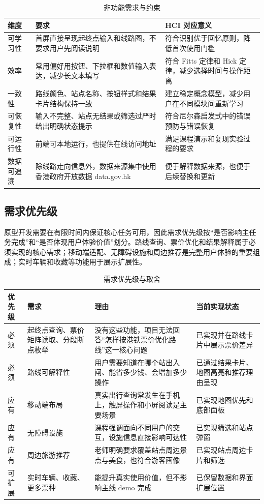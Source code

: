 \documentclass[UTF8,a4paper,11pt]{ctexart}
\begin{document}
\begin{table}[H]
  \centering
  \caption{非功能需求与约束}
  \begin{tabularx}{\textwidth}{p{}YY}
    \toprule
    维度 & 要求 & HCI 对应意义 \\
    \midrule
    可学习性 & 首屏直接呈现起终点输入和线路图，不要求用户先阅读说明 & 符合识别优于回忆原则，降低首次使用门槛 \\
    效率 & 常用偏好用按钮、下拉框和数值输入表达，减少长文本填写 & 符合 Fitts 定律和 Hick 定律，减少选择时间与操作距离 \\
    一致性 & 路线颜色、站点名称、按钮样式和结果卡片结构保持一致 & 建立稳定概念模型，减少用户在不同模块间重新学习 \\
    可恢复性 & 输入不完整、站点无结果或筛选过严时给出明确状态提示 & 符合尼尔森启发式中的错误预防与错误恢复 \\
    可运行性 & 前端可本地运行，也提供在线访问地址 & 满足课程演示和复现实验过程的要求 \\
    数据可追溯 & 除线路走向信息外，数据来源集中使用香港政府开放数据 data.gov.hk & 便于解释数据来源，也便于后续替换和更新 \\
    \bottomrule
  \end{tabularx}
\end{table}

\subsection{需求优先级}

原型开发需要在有限时间内保证核心任务可用，因此需求优先级按“是否影响主任务完成”和“是否体现用户体验价值”划分。路线查询、票价优化和结果解释属于必须实现的核心需求；移动端适配、无障碍设施和周边推荐是完整用户体验的重要组成；实时车辆和收藏等功能用于展示扩展性。

\begin{table}[H]
  \centering
  \caption{需求优先级与取舍}
  \begin{tabularx}{\textwidth}{p{}p{}YY}
    \toprule
    优先级 & 需求 & 理由 & 当前实现状态 \\
    \midrule
    必须 & 起终点查询、票价矩阵读取、分段断点枚举 & 没有这些功能，项目无法回答“怎样按港铁票价优化路线”这一核心问题 & 已实现并在路线卡片中展示票价差异 \\
    必须 & 路线可解释性 & 用户需要知道在哪个站出入闸、能省多少钱、会增加多少操作 & 已通过结果卡片、地图高亮和推荐理由呈现 \\
    应有 & 移动端布局 & 真实出行查询常发生在手机上，触屏操作和小屏阅读是主要场景 & 已实现地图优先和底部面板 \\
    应有 & 无障碍设施 & 课程强调面向不同用户的交互，设施信息直接影响可达性 & 已实现筛选和站点弹窗 \\
    应有 & 周边旅游推荐 & 老师明确要求覆盖站点周边景点与美食，也符合游客画像 & 已实现站点周边卡片和筛选 \\
    可扩展 & 实时车辆、收藏、更多票种 & 能提升真实使用价值，但不影响主线 demo 完成 & 已保留数据和界面扩展位置 \\
    \bottomrule
  \end{tabularx}
\end{table}
\end{document}
